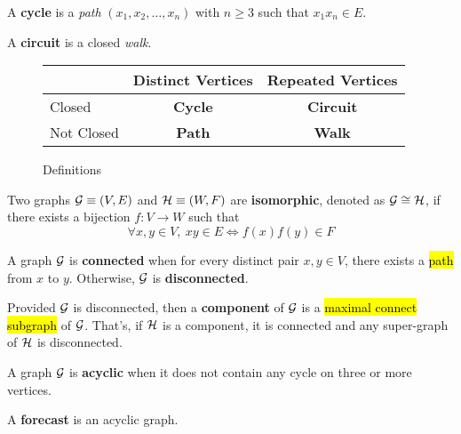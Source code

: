 \documentclass{article}
\begin{document}
		\begin{definition}
			A \textbf{cycle} is a \emph{path} $(x_1, x_2, \dots, x_n)$ with $n \geq 3$ such that $x_1x_n \in E$.
		\end{definition}
		
		\begin{definition}
			A \textbf{circuit} is a closed \emph{walk}.
		\end{definition}
		
		\begin{figure}[h]
			\centering
			\begin{tabular}{l|c|c}
				& Distinct Vertices & Repeated Vertices \\
				\hline
				Closed & \textbf{Cycle} & \textbf{Circuit} \\
				\hline
				Not Closed & \textbf{Path} & \textbf{Walk}
			\end{tabular}
			\caption{Definitions}
		\end{figure}
		
		\begin{definition}
			Two graphs $\mathcal{{G}} \equiv (V, E)$ and $\mathcal{{H}} \equiv (W, F)$ are \textbf{isomorphic}, denoted as $\mathcal{{G}} \cong \mathcal{{H}}$, if there exists a bijection $f: V \to W$ such that
			\begin{equation}
				\forall x, y \in V,\ xy \in E \iff f(x)f(y) \in F
			\end{equation}
		\end{definition}
		
		\begin{definition}
			A graph $\mathcal{{G}}$ is \textbf{connected} when for every distinct pair $x, y \in V$, there exists a \hl{path} from $x$ to $y$. Otherwise, $\mathcal{{G}}$ is \textbf{disconnected}.
		\end{definition}
		
		\begin{definition}
			Provided $\mathcal{{G}}$ is disconnected, then a \textbf{component} of $\mathcal{{G}}$ is a \hl{maximal connect subgraph} of $\mathcal{{G}}$. That's, if $\mathcal{{H}}$ is a component, it is connected and any super-graph of $\mathcal{{H}}$ is disconnected.
		\end{definition}
		
		\begin{definition}
			A graph $\mathcal{{G}}$ is \textbf{acyclic} when it does not contain any cycle on three or more vertices. 
		\end{definition}
		
		\begin{definition}
			A \textbf{forecast} is an acyclic graph.
		\end{definition}
		
\end{document}
